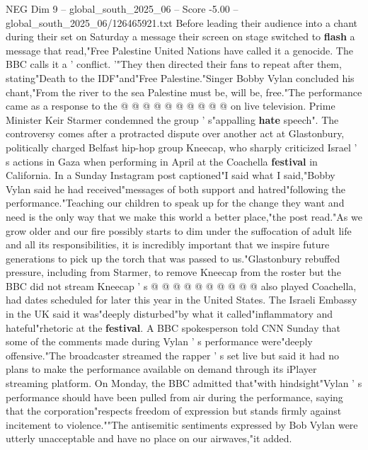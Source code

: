 \begin{textsample}{NEG Dim 9 – global\_south\_2025\_06 – Score -5.00 – global\_south\_2025\_06/126465921.txt}
Before leading their audience into a chant during their set on Saturday a message their screen on stage switched to \textbf{flash} a message that read,"Free Palestine United Nations have called it a genocide.
The BBC calls it a ' conflict. '"They then directed their fans to repeat after them, stating"Death to the IDF"and"Free Palestine."Singer Bobby Vylan concluded his chant,"From the river to the sea Palestine must be, will be, free."The performance came as a response to the @ @ @ @ @ @ @ @ @ @ on live television.
Prime Minister Keir Starmer condemned the group ' s"appalling \textbf{hate} speech".
The controversy comes after a protracted dispute over another act at Glastonbury, politically charged Belfast hip-hop group Kneecap, who sharply criticized Israel ' s actions in Gaza when performing in April at the Coachella \textbf{festival} in California.
In a Sunday Instagram post captioned"I said what I said,"Bobby Vylan said he had received"messages of both support and hatred"following the performance."Teaching our children to speak up for the change they want and need is the only way that we make this world a better place,"the post read."As we grow older and our fire possibly starts to dim under the suffocation of adult life and all its responsibilities, it is incredibly important that we inspire future generations to pick up the torch that was passed to us."Glastonbury rebuffed pressure, including from Starmer, to remove Kneecap from the roster but the BBC did not stream Kneecap ' s @ @ @ @ @ @ @ @ @ @ also played Coachella, had dates scheduled for later this year in the United States.
The Israeli Embassy in the UK said it was"deeply disturbed"by what it called"inflammatory and hateful"rhetoric at the \textbf{festival}.
A BBC spokesperson told CNN Sunday that some of the comments made during Vylan ' s performance were"deeply offensive."The broadcaster streamed the rapper ' s set live but said it had no plans to make the performance available on demand through its iPlayer streaming platform.
On Monday, the BBC admitted that"with hindsight"Vylan ' s performance should have been pulled from air during the performance, saying that the corporation"respects freedom of expression but stands firmly against incitement to violence.""The antisemitic sentiments expressed by Bob Vylan were utterly unacceptable and have no place on our airwaves,"it added.

\end{textsample}
